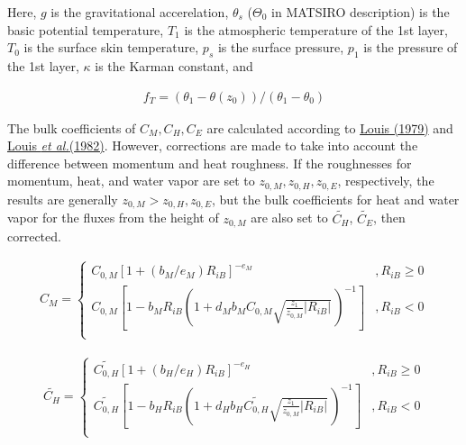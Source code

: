 Here, \(g\) is the gravitational accerelation, \(\theta_s\)
(\(\Theta_0\) in MATSIRO description) is the basic potential
temperature, \(T_1\) is the atmospheric temperature of the 1st layer,
\(T_0\) is the surface skin temperature, \(p_s\) is the surface
pressure, \(p_1\) is the pressure of the 1st layer, \(\kappa\) is the
Karman constant, and

\begin{eqnarray}
f_T = (\theta_1 - \theta(z_0))/(\theta_1 - \theta_0)
\end{eqnarray}

The bulk coefficients of \(C_M,C_H,C_E\) are calculated according to
\href{https://link.springer.com/content/pdf/10.1007/BF00117978.pdf}{Louis
(1979)} and
\href{https://www.ecmwf.int/en/elibrary/10845-short-history-pbl-parameterization-ecmwf}{Louis
{\emph{et al.}}(1982)}. However, corrections are made to take into
account the difference between momentum and heat roughness. If the
roughnesses for momentum, heat, and water vapor are set to
\(z_{0,M}, z_{0,H}, z_{0,E}\), respectively, the results are generally
\(z_{0,M} > z_{0,H}, z_{0,E}\), but the bulk coefficients for heat and
water vapor for the fluxes from the height of \(z_{0,M}\) are also set
to \(\widetilde{C_H}\), \(\widetilde{C_E}\), then corrected.

\begin{eqnarray}
    C_M = \left\{
      \begin{array}{lr}
      C_{0,M} [ 1 + (b_M/e_M)  R_{iB} ]^{-e_M}
            &,
          R_{iB} \geq 0 \\
      C_{0,M} \left[ 1 - b_M R_{iB} \left( 1+ d_M b_M C_{0,M}
                                  \sqrt{\frac{z_1}{z_{0,M}}| R_{iB}|} \,
                                  \right)^{-1} \right]     
          &,
          R_{iB} < 0 \\
      \end{array} \right.
\end{eqnarray}

\begin{eqnarray}
    \widetilde{C_H} = \left\{
      \begin{array}{lr}
      \widetilde{C_{0,H}} [ 1 + (b_H/e_H) R_{iB} ]^{-e_H}
            &,
          R_{iB} \geq 0 \\
      \widetilde{C_{0,H}} \left[ 1 - b_H R_{iB}
                                  \left( 1+ d_H b_H \widetilde{C_{0,H}}
                                  \sqrt{\frac{z_1}{z_{0,M}}| R_{iB}|} \,
                                  \right)^{-1} \right]
             &,     
          R_{iB} < 0 \\
      \end{array} \right.
\end{eqnarray}

